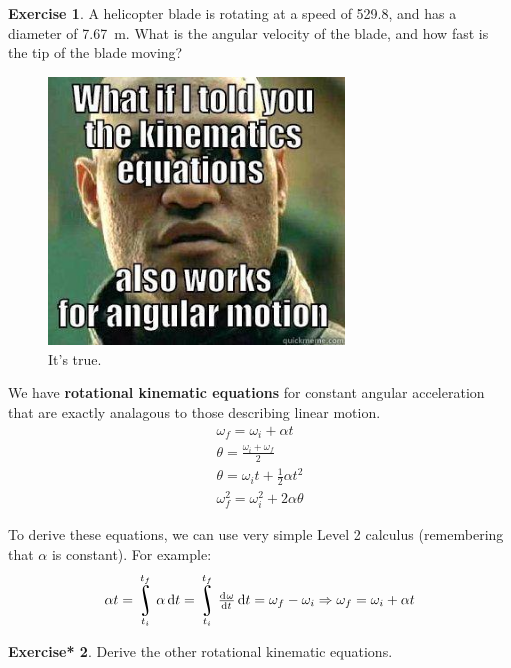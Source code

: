 \documentclass[a4paper]{amsbook}
\theoremstyle{definition}
\newtheorem{exercise}{Exercise}
\numberwithin{exercise}{chapter}
\newtheorem{exercise*}[exercise]{Exercise*}
\numberwithin{exercise}{chapter}
\DeclareMathOperator*{\rint}{\scalerel*{\rotatebox{17}{$\!\int\!$}}{\int}}
\begin{document}
\begin{exercise}
  A helicopter blade is rotating at a speed of \SI{529.8}{\rpm}, and has a diameter of \SI{7.67}{\metre}. What is the angular
  velocity of the blade, and how fast is the tip of the blade moving?
\end{exercise}

\begin{figure}
  \centering
  \includegraphics[width=0.7\textwidth]{kinematics}
  \caption{It's true.\label{fig:kinematics}}
\end{figure}

We have \textbf{rotational kinematic equations} for constant angular acceleration that are exactly analagous to those describing linear motion.
\begin{gather}
  \omega_f = \omega_i + \alpha t\\
  \theta = \frac{\omega_i + \omega_f}{2}\\
  \theta = \omega_i t + \frac{1}{2} \alpha t^2\\
  \omega_f^2 = \omega_i^2 + 2 \alpha \theta
\end{gather}

To derive these equations, we can use very simple Level 2 calculus (remembering that $ \alpha $ is constant). For example:
\begin{gather*}
  \alpha t = \rint_{t_i}^{t_f} \alpha \dif{t} = \rint_{t_i}^{t_f} \od{\omega}{t} \dif{t} = \omega_f - \omega_i \Rightarrow \omega_f = \omega_i + \alpha t\\
\end{gather*}

\begin{exercise*}
  Derive the other rotational kinematic equations.
\end{exercise*}
\end{document}
